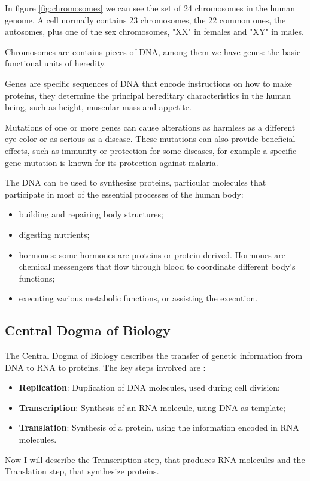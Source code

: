 In figure \ref{fig:chromosomes} we can see the set of 24 chromosomes in the human genome. A cell normally contains 23 chromosomes, the 22 common ones, the autosomes, plus one of the sex chromosomes, "XX" in females and "XY" in males.

Chromosomes are contains pieces of DNA, among them we have genes: the basic functional units of heredity.

Genes are specific sequences of DNA that encode instructions on how to make proteins, they determine the principal hereditary characteristics in the human being, such as height, muscular mass and appetite.

Mutations of one or more genes can cause alterations as harmless as a different eye color or as serious as a disease. These mutations can also provide beneficial effects, such as immunity or protection for some diseases, for example a specific gene mutation is known for its protection against malaria.


The DNA can be used to synthesize proteins, particular molecules that participate in most of the essential processes of the human body:
\begin{itemize}
	\item building and repairing body structures;
	\item digesting nutrients;
	\item hormones: some hormones are proteins or protein-derived. Hormones are chemical messengers that flow through blood to coordinate different body's functions;
	\item executing various metabolic functions, or assisting the execution.
\end{itemize}

\subsection{Central Dogma of Biology}

The Central Dogma of Biology describes the transfer of genetic information from DNA to RNA to proteins. The key steps involved are :
\begin{itemize}
    \item \textbf{Replication}: Duplication of DNA molecules, used during cell division;
    \item \textbf{Transcription}: Synthesis of an RNA molecule, using DNA as template;
    \item \textbf{Translation}: Synthesis of a protein, using the information encoded in RNA molecules.
\end{itemize}
Now I will describe the Transcription step, that produces RNA molecules and the Translation step, that synthesize proteins.


